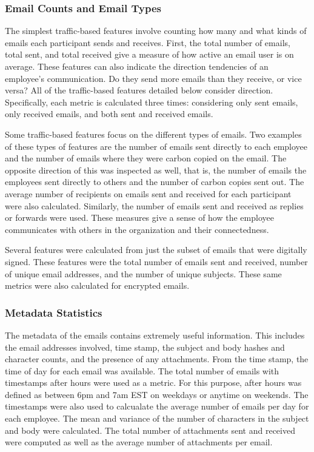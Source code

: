 \documentclass[12pt]{report}
\begin{document}
\subsubsection{Email Counts and Email Types}
The simplest traffic-based features involve counting how many and what kinds of emails each participant sends and receives.
First, the total number of emails, total sent, and total received give a measure of how active an email user is on average.
These features can also indicate the direction tendencies of an employee's communication. 
Do they send more emails than they receive, or vice versa?  All of the traffic-based features detailed below consider direction.
Specifically, each metric is calculated three times: considering only sent emails, only received emails, and both sent and received emails.

Some traffic-based features focus on the different types of emails.
Two examples of these types of features are the number of emails sent directly to each employee and the number of emails where they were carbon copied on the email.
The opposite direction of this was inspected as well, that is, the number of emails the employees sent directly to others and the number of carbon copies sent out.
The average number of recipients on emails sent and received for each participant were also calculated.
Similarly, the number of emails sent and received as replies or forwards were used.
These measures give a sense of how the employee communicates with others in the organization and their connectedness.

Several features were calculated from just the subset of emails that were digitally signed.  These features were the total number of emails sent and received, number of unique email addresses, and the number of unique subjects.
These same metrics were also calculated for encrypted emails.

\subsubsection{Metadata Statistics}
The metadata of the emails contains extremely useful information.  This includes the email addresses involved, time stamp, the subject and body hashes and character counts, and the presence of any attachments.
From the time stamp, the time of day for each email was available.
The total number of emails with timestamps after hours were used as a metric.
For this purpose, after hours was defined as between 6pm and 7am EST on weekdays or anytime on weekends.
The timestamps were also used to calcualate the average number of emails per day for each employee.
The mean and variance of the number of characters in the subject and body were calculated.
The total number of attachments sent and received were computed as well as the average number of attachments per email.
\end{document}
